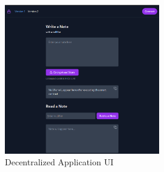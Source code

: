 \documentclass[twocolumn,10pt]{article}
\begin{document}
\begin{figure}[!htb]
    \centering
    \includegraphics[width=0.6\textwidth]{./figures/web3.png}
    \caption{Decentralized Application UI}
    \label{fig:web3}
\end{figure}
\end{document}
